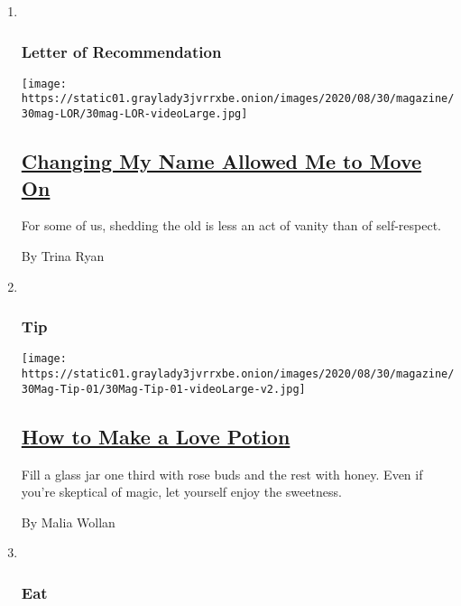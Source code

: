 \begin{enumerate}
\def\labelenumi{\arabic{enumi}.}
\item ~
  \hypertarget{letter-of-recommendation}{%
  \subsubsection{Letter of
  Recommendation}\label{letter-of-recommendation}}

  \texttt{[image: https://static01.graylady3jvrrxbe.onion/images/2020/08/30/magazine/30mag-LOR/30mag-LOR-videoLarge.jpg]}

  \hypertarget{changing-my-name-allowed-me-to-move-on}{%
  \subsection{\texorpdfstring{\href{/2020/08/26/magazine/name-change.html}{Changing
  My Name Allowed Me to Move
  On}}{Changing My Name Allowed Me to Move On}}\label{changing-my-name-allowed-me-to-move-on}}

  For some of us, shedding the old is less an act of vanity than of
  self-respect.

  By Trina Ryan
\item ~
  \hypertarget{tip}{%
  \subsubsection{Tip}\label{tip}}

  \texttt{[image: https://static01.graylady3jvrrxbe.onion/images/2020/08/30/magazine/30Mag-Tip-01/30Mag-Tip-01-videoLarge-v2.jpg]}

  \hypertarget{how-to-make-a-love-potion}{%
  \subsection{\texorpdfstring{\href{/2020/08/25/magazine/how-to-make-a-love-potion.html}{How
  to Make a Love
  Potion}}{How to Make a Love Potion}}\label{how-to-make-a-love-potion}}

  Fill a glass jar one third with rose buds and the rest with honey.
  Even if you're skeptical of magic, let yourself enjoy the sweetness.

  By Malia Wollan
\item ~
  \hypertarget{eat}{%
  \subsubsection{Eat}\label{eat}}


\end{enumerate}

